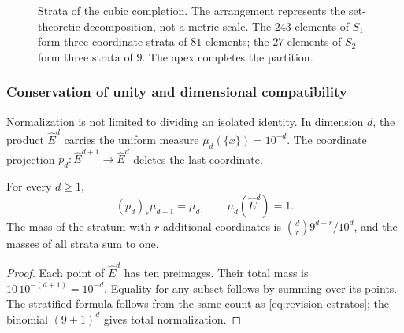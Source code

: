 \begin{figure}[htbp]
\centering
{}
\caption{Strata of the cubic completion. The arrangement represents
the set-theoretic decomposition, not a metric scale. The \(243\) elements
of \(S_1\) form three coordinate strata of \(81\) elements; the \(27\)
elements of \(S_2\) form three strata of \(9\). The apex completes the partition.}
\label{fig:revision-emrh}
\end{figure}



\subsubsection{Conservation of unity and dimensional compatibility}

Normalization is not limited to dividing an isolated identity. In dimension
\(d\), the product \(\widehat E^d\) carries the uniform measure
\(\mu_d(\{x\})=10^{-d}\). The coordinate projection
\(p_d:\widehat E^{d+1}\to\widehat E^d\) deletes the last coordinate.

\begin{proposition}
For every \(d\geq1\),
\[
 (p_d)_*\mu_{d+1}=\mu_d,
 \qquad \mu_d(\widehat E^d)=1.
\]
The mass of the stratum with \(r\) additional coordinates is
\(\binom dr9^{d-r}/10^d\), and the masses of all strata sum to one.
\end{proposition}
\begin{proof}
Each point of \(\widehat E^d\) has ten preimages. Their total mass is
\(10\,10^{-(d+1)}=10^{-d}\). Equality for any subset follows by
summing over its points. The stratified formula follows from the same
count as \eqref{eq:revision-estratos}; the binomial
\((9+1)^d\) gives total normalization.
\end{proof}

